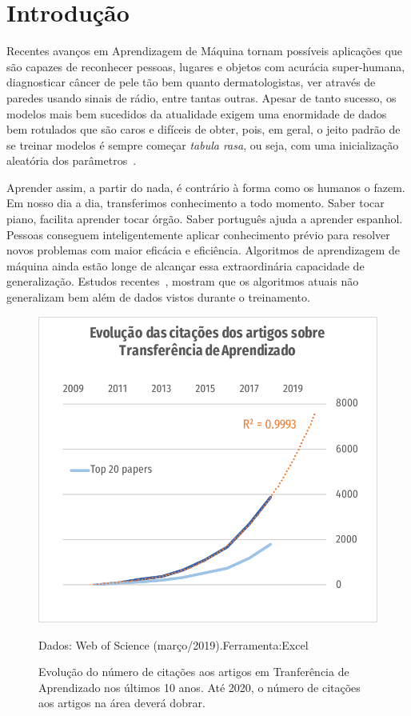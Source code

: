 \documentclass[sigconf]{acmart}
\newcommand{\source}[2]{\raggedleft{}\vspace*{-7mm}\caption*{ \textmd{\scriptsize{Dados: {#1}.\hfill Ferramenta:{#2}}}}}
\begin{document}
\section{Introdução} 
  Recentes avanços em Aprendizagem de Máquina tornam possíveis aplicações que são capazes de reconhecer pessoas, lugares e objetos com acurácia super-humana\cite{fei}, diagnosticar câncer de pele tão bem quanto dermatologistas\cite{skin_cancer},  ver através de paredes usando sinais de rádio\cite{wifi}, entre tantas outras. Apesar de tanto sucesso, os modelos mais bem sucedidos da atualidade exigem uma enormidade de dados bem rotulados que são caros e difíceis de obter, pois, em geral, o jeito padrão de se treinar modelos é sempre começar \emph{tabula rasa}, ou seja, com uma inicialização aleatória dos parâmetros~\cite{Ruder2019Neural}. 
  
  Aprender assim, a partir do nada, é contrário à forma como os humanos o fazem. Em nosso dia a dia, transferimos conhecimento a todo momento. Saber tocar piano, facilita aprender tocar órgão. Saber português ajuda a aprender espanhol. Pessoas conseguem inteligentemente aplicar conhecimento prévio para resolver novos problemas com maior eficácia e eficiência\cite{PanYang}. Algoritmos de aprendizagem de máquina ainda estão longe de alcançar essa extraordinária capacidade de generalização\cite{goodfellow}. Estudos recentes~\cite{DBLP:journals/corr/JiaL17}, mostram que os algoritmos atuais não generalizam bem além de dados vistos durante o treinamento. 
  \begin{figure}[h]
    \includegraphics[width=\columnwidth]{citacoes_por_ano}
    \source{Web of Science (março/2019)}{Excel}
    \caption{Evolução do número de citações aos artigos em Tranferência de Aprendizado nos últimos 10 anos. Até 2020, o número de citações aos artigos na área deverá dobrar.}
    \label{fig:citacoes_por_ano}
  \end{figure}
\end{document}
